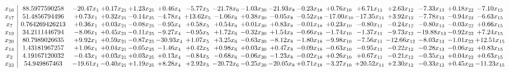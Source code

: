 \documentclass[9pt]{article}
\begin{document}
\[\begin{array}{c| c c@{\hskip 2pt} c@{\hskip 2pt} c@{\hskip 2pt} c@{\hskip 2pt} c@{\hskip 2pt} c@{\hskip 2pt} c@{\hskip 2pt} c@{\hskip 2pt} c@{\hskip 2pt} c@{\hskip 2pt} c@{\hskip 2pt} c@{\hskip 2pt} c@{\hskip 2pt} c@{\hskip 2pt} c@{\hskip 2pt} }
 x_{16}   &  88.5977590258 & -20.47 x_{1} & +  0.17 x_{21} & +  1.23 x_{25} & +  0.46 x_{4} & -5.77 x_{5} & -21.78 x_{6} & -1.03 x_{30} & -21.93 x_{8} & -0.23 x_{18} & +  0.76 x_{10} & +  6.71 x_{11} & +  2.63 x_{12} & -7.33 x_{13} & +  0.18 x_{22} & -7.10 x_{15}\\
 x_{17}   &  51.4856794496 & +  0.73 x_{1} & +  0.32 x_{21} & -0.14 x_{25} & -4.78 x_{4} & + 13.62 x_{5} & -1.06 x_{6} & +  0.38 x_{30} & -0.05 x_{8} & -0.52 x_{18} & -17.00 x_{10} & -17.35 x_{11} & +  3.92 x_{12} & -7.78 x_{13} & -0.94 x_{22} & -6.63 x_{15}\\
 x_{7}   &  0.764269426213 & +  0.36 x_{1} & +  0.03 x_{21} & -0.08 x_{25} & -0.95 x_{4} & +  0.58 x_{5} & +  0.54 x_{6} & +  0.01 x_{30} & +  0.83 x_{8} & -0.01 x_{18} & +  0.23 x_{10} & -0.80 x_{11} & -0.24 x_{12} & -0.80 x_{13} & -0.03 x_{22} & +  0.66 x_{15}\\
 x_{19}   &  34.2111446794 & -8.06 x_{1} & +  0.45 x_{21} & -0.11 x_{25} & -9.27 x_{4} & -0.95 x_{5} & +  1.72 x_{6} & -0.32 x_{30} & +  1.54 x_{8} & -0.66 x_{18} & -1.74 x_{10} & -1.37 x_{11} & -9.73 x_{12} & -19.88 x_{13} & -0.92 x_{22} & +  7.24 x_{15}\\
 x_{20}   &  80.7989026635 & +  9.92 x_{1} & +  0.59 x_{21} & -0.87 x_{25} & -30.93 x_{4} & +  1.07 x_{5} & +  3.25 x_{6} & -0.63 x_{30} & -8.12 x_{8} & -1.80 x_{18} & -9.98 x_{10} & -7.56 x_{11} & -12.66 x_{12} & -8.03 x_{13} & -1.01 x_{22} & + 12.51 x_{15}\\
 x_{14}   &  1.43181967257 & +  1.06 x_{1} & +  0.04 x_{21} & -0.05 x_{25} & -1.46 x_{4} & +  0.42 x_{5} & +  0.98 x_{6} & +  0.03 x_{30} & +  0.47 x_{8} & -0.09 x_{18} & -0.63 x_{10} & -0.95 x_{11} & -0.22 x_{12} & -0.28 x_{13} & -0.06 x_{22} & +  0.83 x_{15}\\
 x_{2}   &  4.19167120032 & -0.43 x_{1} & +  0.03 x_{21} & +  0.03 x_{25} & +  0.13 x_{4} & -0.84 x_{5} & -0.68 x_{6} & -0.06 x_{30} & -1.23 x_{8} & -0.02 x_{18} & +  0.26 x_{10} & +  0.67 x_{11} & -0.21 x_{12} & -0.35 x_{13} & +  0.04 x_{22} & +  0.63 x_{15}\\
 x_{23}   &  54.949867463 & -19.61 x_{1} & -0.40 x_{21} & +  1.19 x_{25} & +  8.28 x_{4} & +  2.92 x_{5} & -20.72 x_{6} & -0.25 x_{30} & -20.05 x_{8} & +  0.71 x_{18} & -3.27 x_{10} & + 20.52 x_{11} & +  2.30 x_{12} & -0.33 x_{13} & +  0.45 x_{22} & -11.23 x_{15}\\

\end{array}\]
\end{document}
